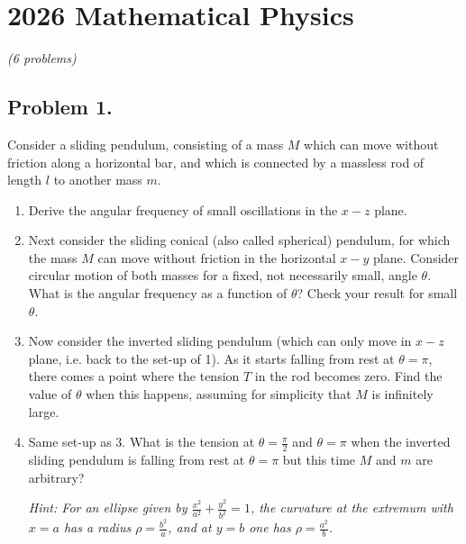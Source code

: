 \section{2026 Mathematical Physics}

\textit{(6 problems)}

\subsection*{Problem 1.}

\begin{exercise}
\label{physics:2026:1}
Consider a sliding pendulum, consisting of a mass $M$ which can move without friction along a horizontal bar, and which is connected by a massless rod of length $l$ to another mass $m$.

\begin{enumerate}
    \item Derive the angular frequency of small oscillations in the $x-z$ plane.
    \item Next consider the sliding conical (also called spherical) pendulum, for which the mass $M$ can move without friction in the horizontal $x-y$ plane. Consider circular motion of both masses for a fixed, not necessarily small, angle $\theta$. What is the angular frequency as a function of $\theta$? Check your result for small $\theta$.
    \item Now consider the inverted sliding pendulum (which can only move in $x-z$ plane, i.e. back to the set-up of 1). As it starts falling from rest at $\theta=\pi$, there comes a point where the tension $T$ in the rod becomes zero. Find the value of $\theta$ when this happens, assuming for simplicity that $M$ is infinitely large.
    \item Same set-up as 3. What is the tension at $\theta=\frac{\pi}{2}$ and $\theta=\pi$ when the inverted sliding pendulum is falling from rest at $\theta=\pi$ but this time $M$ and $m$ are arbitrary?

    \textit{Hint: For an ellipse given by $\frac{x^2}{a^2}+\frac{y^2}{b^2}=1$, the curvature at the extremum with $x=a$ has a radius $\rho=\frac{b^2}{a}$, and at $y=b$ one has $\rho=\frac{a^2}{b}$.}
\end{enumerate}
\end{exercise}

